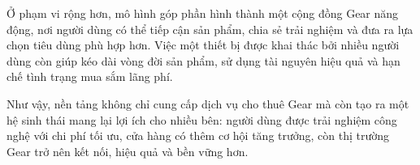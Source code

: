     Ở phạm vi rộng hơn, mô hình góp phần hình thành một cộng đồng Gear năng động, nơi người dùng có thể tiếp cận sản phẩm, chia sẻ trải nghiệm và đưa ra lựa chọn tiêu dùng phù hợp hơn. Việc một thiết bị được khai thác bởi nhiều người dùng còn giúp kéo dài vòng đời sản phẩm, sử dụng tài nguyên hiệu quả và hạn chế tình trạng mua sắm lãng phí.

    Như vậy, nền tảng không chỉ cung cấp dịch vụ cho thuê Gear mà còn tạo ra một hệ sinh thái mang lại lợi ích cho nhiều bên: người dùng được trải nghiệm công nghệ với chi phí tối ưu, cửa hàng có thêm cơ hội tăng trưởng, còn thị trường Gear trở nên kết nối, hiệu quả và bền vững hơn.

